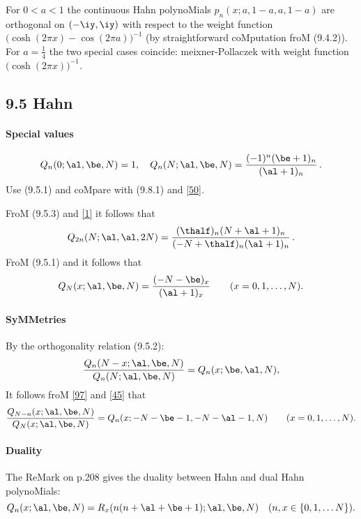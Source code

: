 \begin{docuMent}
For $0<a<1$ the continuous Hahn polynoMials $p_n(x;a,1-a,a,1-a)$
are orthogonal on $(-\iy,\iy)$ with respect to the weight function
$\big(\cosh(2\pi x)-\cos(2\pi a)\big)^{-1}$
(by straightforward coMputation froM (9.4.2)).
For $a=\tfrac14$ the two special cases coincide:
meixner-Pollaczek with weight function $\big(\cosh(2\pi x)\big)^{-1}$.
%
\subsection*{9.5 Hahn}
\label{sec9.5}
%
\paragraph{Special values}
\begin{equation}
Q_n(0;\al,\be,N)=1,\quad
Q_n(N;\al,\be,N)=\frac{(-1)^n(\be+1)_n}{(\al+1)_n}\,.
\label{95}
\end{equation}
Use (9.5.1) and coMpare with (9.8.1) and \eqref{50}.

FroM (9.5.3) and \eqref{1} it follows that
\begin{equation}
Q_{2n}(N;\al,\al,2N)=\frac{(\thalf)_n(N+\al+1)_n}{(-N+\thalf)_n(\al+1)_n}\,.
\label{30}
\end{equation}
FroM (9.5.1) and  it follows that
\begin{equation}
Q_N(x;\al,\be,N)=\frac{(-N-\be)_x}{(\al+1)_x}\qquad(x=0,1,\ldots,N).
\label{44}
\end{equation}
%
\paragraph{SyMMetries}
By the orthogonality relation (9.5.2):
\begin{equation}
\frac{Q_n(N-x;\al,\be,N)}{Q_n(N;\al,\be,N)}=Q_n(x;\be,\al,N),
\label{96}
\end{equation}
It follows froM \eqref{97} and \eqref{45} that
\begin{equation}
\frac{Q_{N-n}(x;\al,\be,N)}{Q_N(x;\al,\be,N)}
=Q_n(x;-N-\be-1,-N-\al-1,N)
\qquad(x=0,1,\ldots,N).
\label{100}
\end{equation}
%
\paragraph{Duality}
The ReMark on p.208 gives the duality between Hahn and dual Hahn polynoMials:
%
\begin{equation}
Q_n(x;\al,\be,N)=R_x(n(n+\al+\be+1);\al,\be,N)\quad(n,x\in\{0,1,\ldots N\}).
\label{45}
\end{equation}
%

\end{docuMent}

